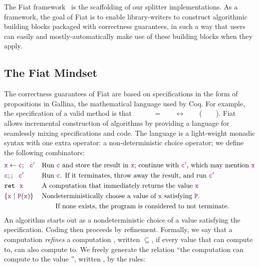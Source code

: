   The Fiat framework~\cite{fiat} is the scaffolding of our splitter implementations.  As a framework, the goal of Fiat is to enable library-writers to construct algorithmic building blocks packaged with correctness guarantees, in such a way that users can easily and mostly-automatically make use of these building blocks when they apply. 
  
  \subsection{The Fiat Mindset}
    The correctness guarantees of Fiat are based on specifications in the form of propositions in Gallina, the mathematical language used by Coq.  For example, the specification of a valid  method is that ~~~~~~=~~\true~~\allowbreak$\longleftrightarrow$\allowbreak~~~~(~~~~).  Fiat allows incremental construction of algorithms by providing a language for seamlessly mixing specifications and code.  The language is a light-weight monadic syntax with one extra operator: a non-deterministic choice operator; we define the following combinators:
    \begin{align*}
      &\textcolor{violet}{\texttt{x}} \leftarrow \textcolor{violet}{\texttt{c}};~~\textcolor{violet}{\texttt{c$'$}} && \text{Run \textcolor{violet}{\texttt{c}} and store the result in \textcolor{violet}{\texttt{x}}; continue with \textcolor{violet}{\texttt{c$'$}}, which may mention \textcolor{violet}{\texttt{x}}} \\
      &\textcolor{violet}{\texttt{c}};;~~\textcolor{violet}{\texttt{c$'$}}&&\text{Run \textcolor{violet}{\texttt{c}}.  If it terminates, throw away the result, and run \textcolor{violet}{\texttt{c$'$}}} \\
      &\texttt{ret}~~\textcolor{violet}{\texttt{x}} && \text{A computation that immediately returns the value \textcolor{violet}{\texttt{x}}} \\
      &\{ \textcolor{violet}{\texttt{x}}~|~\textcolor{violet}{\texttt{P}}(\textcolor{violet}{\texttt{x}}) \}&&\text{Nondeterministically choose a value of \textcolor{violet}{\texttt{x}} satisfying \textcolor{violet}{\texttt{P}}.} \\
      &&&\qquad\text{If none exists, the program is considered to not terminate.}
    \end{align*}
    An algorithm starts out as a nondeterministic choice of a value satisfying the specification.  Coding then proceeds by refinement.  Formally, we say that a computation  \emph{refines} a computation , written $\subseteq$, if every value that  can compute to,  can also compute to.  We freely generate the relation ``the computation  can compute to the value '', written , by the rules:
